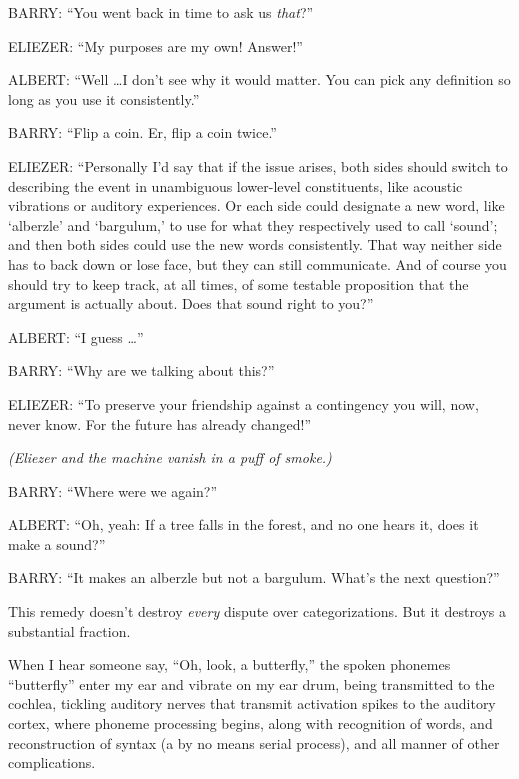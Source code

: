 {
 BARRY: ``You went back in time to ask us
\textit{that}?''}

{
 ELIEZER: ``My purposes are my own!
Answer!''}

{
 ALBERT: ``Well \ldots I don't see
why it would matter. You can pick any definition so long as you use it
consistently.''}

{
 BARRY: ``Flip a coin. Er, flip a coin
twice.''}

{
 ELIEZER: ``Personally I'd say
that if the issue arises, both sides should switch to describing the
event in unambiguous lower-level constituents, like acoustic vibrations
or auditory experiences. Or each side could designate a new word, like
`alberzle' and
`bargulum,' to use for what they
respectively used to call `sound'; and
then both sides could use the new words consistently. That way neither
side has to back down or lose face, but they can still communicate. And
of course you should try to keep track, at all times, of some testable
proposition that the argument is actually about. Does that sound right
to you?''}

{
 ALBERT: ``I guess \ldots''}

{
 BARRY: ``Why are we talking about
this?''}

{
 ELIEZER: ``To preserve your friendship against a
contingency you will, now, never know. For the future has already
changed!''}

{
 \textit{(Eliezer and the machine vanish in a puff of smoke.)}}

{
 BARRY: ``Where were we
again?''}

{
 ALBERT: ``Oh, yeah: If a tree falls in the
forest, and no one hears it, does it make a sound?''}

{
 BARRY: ``It makes an alberzle but not a bargulum.
What's the next question?''}

{
 This remedy doesn't destroy \textit{every} dispute
over categorizations. But it destroys a substantial fraction.}

\myendsectiontext


{
 When I hear someone say, ``Oh, look, a
butterfly,'' the spoken phonemes
``butterfly'' enter my ear and
vibrate on my ear drum, being transmitted to the cochlea, tickling
auditory nerves that transmit activation spikes to the auditory cortex,
where phoneme processing begins, along with recognition of words, and
reconstruction of syntax (a by no means serial process), and all manner
of other complications. }

